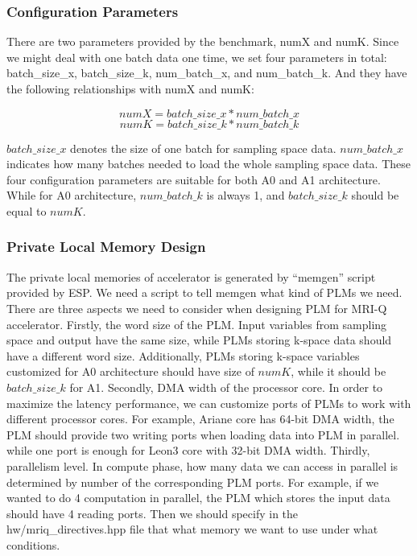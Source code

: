 \subsubsection{Configuration Parameters}

There are two parameters provided by the benchmark, numX and numK. Since we
might deal with one batch data one time, we set four parameters in total:
batch\_size\_x, batch\_size\_k, num\_batch\_x, and num\_batch\_k. And they have
the following relationships with numX and numK:

    $$numX = batch\_size\_x * num\_batch\_x$$
    $$numK = batch\_size\_k * num\_batch\_k$$

$batch\_size\_x$ denotes the size of one batch for sampling space
data. $num\_batch\_x$ indicates how many batches needed to load the whole
sampling space data. These four configuration parameters are suitable for both
A0 and A1 architecture. While for A0 architecture, $num\_batch\_k$ is always 1,
and $batch\_size\_k$ should be equal to $numK$.\\

\subsubsection{Private Local Memory Design}

The private local memories of accelerator is generated by ``memgen'' script
provided by ESP. We need a script to tell memgen what kind of PLMs we
need. There are three aspects we need to consider when designing PLM for MRI-Q
accelerator. Firstly, the word size of the PLM. Input variables from sampling
space and output have the same size, while PLMs storing k-space data should have
a different word size. Additionally, PLMs storing k-space variables customized
for A0 architecture should have size of $numK$, while it should be
$batch\_size\_k$ for A1. Secondly, DMA width of the processor core. In order to
maximize the latency performance, we can customize ports of PLMs to work with
different processor cores. For example, Ariane core has 64-bit DMA width, the
PLM should provide two writing ports when loading data into PLM in
parallel. while one port is enough for Leon3 core with 32-bit DMA
width. Thirdly, parallelism level. In compute phase, how many data we can access
in parallel is determined by number of the corresponding PLM ports. For example,
if we wanted to do 4 computation in parallel, the PLM which stores the input
data should have 4 reading ports. Then we should specify in the
hw/mriq\_directives.hpp file that what memory we want to use under what
conditions.



